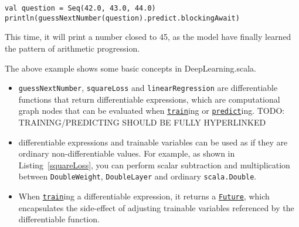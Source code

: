 \begin{lstlisting}[float={h t b p},caption={Inference on a trained model},label={predict_trained}]
val question = Seq(42.0, 43.0, 44.0)
println(guessNextNumber(question).predict.blockingAwait)
\end{lstlisting}

This time, it will print a number closed to 45, as the model have finally learned the pattern of arithmetic progression.

The above example shows some basic concepts in DeepLearning.scala.

\begin{itemize}
  \item \lstinline{guessNextNumber}, \lstinline{squareLoss} and \lstinline{linearRegression} are \glspl{differentiable function} that return \glspl{differentiable expression}, which are \gls{computational graph} nodes that can be evaluated when \href{https://javadoc.io/page/com.thoughtworks.deeplearning/deeplearning_2.11/latest/com/thoughtworks/deeplearning/DeepLearning.html#train(differentiable:Differentiable)(implicitmonoid:algebra.ring.MultiplicativeMonoid[DeepLearning.this.Delta]):com.thoughtworks.future.Future[DeepLearning.this.Data]}{\lstinline{train}}ing or \href{https://javadoc.io/page/com.thoughtworks.deeplearning/deeplearning_2.11/latest/com/thoughtworks/deeplearning/DeepLearning.html#predict(differentiable:Differentiable):com.thoughtworks.future.Future[DeepLearning.this.Data]}{\lstinline{predict}}ing.
  TODO: TRAINING/PREDICTING SHOULD BE FULLY HYPERLINKED
  \item \Glspl{differentiable expression} and \glspl{trainable variable} can be used as if they are ordinary non-differentiable values. For example, as shown in Listing~\ref{squareLoss}, you can perform scalar subtraction and multiplication between \lstinline{DoubleWeight}, \lstinline{DoubleLayer} and ordinary \lstinline{scala.Double}.
  \item When \href{https://javadoc.io/page/com.thoughtworks.deeplearning/deeplearning_2.11/latest/com/thoughtworks/deeplearning/DeepLearning.html#train(differentiable:Differentiable)(implicitmonoid:algebra.ring.MultiplicativeMonoid[DeepLearning.this.Delta]):com.thoughtworks.future.Future[DeepLearning.this.Data]}{\lstinline{train}}ing a \gls{differentiable expression}, it returns a \href{https://javadoc.io/page/com.thoughtworks.future/future_2.11/latest/com/thoughtworks/future%24%24Future.html}{\lstinline{Future}}, which encapsulates the side-effect of adjusting \glspl{trainable variable} referenced by the \gls{differentiable function}.

\end{itemize}
